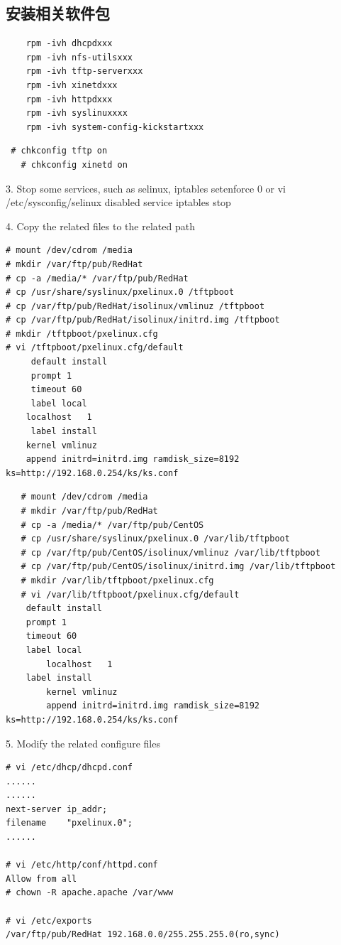 \subsection{安装相关软件包}

\small{
\begin{verbatim}
	rpm -ivh dhcpdxxx
	rpm -ivh nfs-utilsxxx
	rpm -ivh tftp-serverxxx
	rpm -ivh xinetdxxx
	rpm -ivh httpdxxx
	rpm -ivh syslinuxxxx
	rpm -ivh system-config-kickstartxxx
\end{verbatim}
}
\normalsize

\small{
\begin{verbatim}
 # chkconfig tftp on
   # chkconfig xinetd on
\end{verbatim}
}
\normalsize
   
3. Stop some services, such as selinux, iptables
   setenforce 0
or  vi /etc/sysconfig/selinux disabled
    service iptables stop

4. Copy the related files to the related path

\small{
\begin{verbatim}
# mount /dev/cdrom /media
# mkdir /var/ftp/pub/RedHat
# cp -a /media/* /var/ftp/pub/RedHat
# cp /usr/share/syslinux/pxelinux.0 /tftpboot
# cp /var/ftp/pub/RedHat/isolinux/vmlinuz /tftpboot
# cp /var/ftp/pub/RedHat/isolinux/initrd.img /tftpboot
# mkdir /tftpboot/pxelinux.cfg
# vi /tftpboot/pxelinux.cfg/default 
     default install
     prompt 1
     timeout 60
     label local
	localhost	1
     label install
	kernel vmlinuz
	append initrd=initrd.img ramdisk_size=8192 ks=http://192.168.0.254/ks/ks.conf
\end{verbatim}
}
\normalsize

\small{
\begin{verbatim}
   # mount /dev/cdrom /media
   # mkdir /var/ftp/pub/RedHat
   # cp -a /media/* /var/ftp/pub/CentOS
   # cp /usr/share/syslinux/pxelinux.0 /var/lib/tftpboot
   # cp /var/ftp/pub/CentOS/isolinux/vmlinuz /var/lib/tftpboot
   # cp /var/ftp/pub/CentOS/isolinux/initrd.img /var/lib/tftpboot
   # mkdir /var/lib/tftpboot/pxelinux.cfg
   # vi /var/lib/tftpboot/pxelinux.cfg/default
	default install
	prompt 1
	timeout 60
	label local
		localhost	1
	label install
		kernel vmlinuz
		append initrd=initrd.img ramdisk_size=8192 ks=http://192.168.0.254/ks/ks.conf
\end{verbatim}
}
\normalsize

5. Modify the related configure files

\small{
\begin{verbatim}
# vi /etc/dhcp/dhcpd.conf
......
......
next-server	ip_addr;
filename	"pxelinux.0";
......

# vi /etc/http/conf/httpd.conf
Allow from all
# chown -R apache.apache /var/www

# vi /etc/exports
/var/ftp/pub/RedHat 192.168.0.0/255.255.255.0(ro,sync)
\end{verbatim}
}
\normalsize

